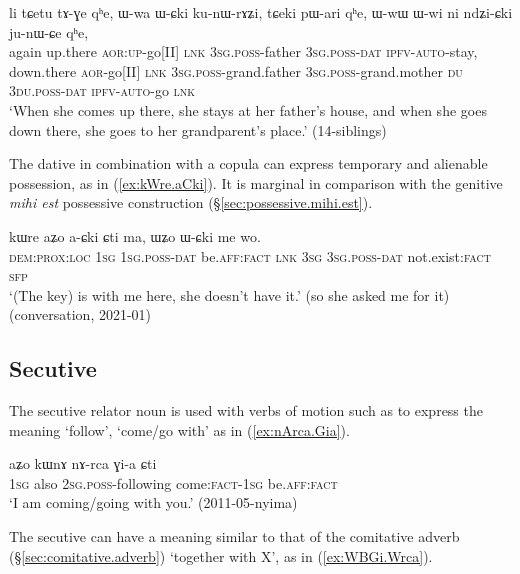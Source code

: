 \begin{exe}
\ex \label{ex:WCki.kunWrAZi}
\gll  li tɕetu tɤ-ɣe qʰe, ɯ-wa ɯ-ɕki ku-nɯ-rɤʑi, tɕeki pɯ-ari qʰe, ɯ-wɯ ɯ-wi ni ndʑi-ɕki ju-nɯ-ɕe qʰe, \\
again up.there \textsc{aor}:\textsc{up}-go[II] \textsc{lnk} \textsc{3sg}.\textsc{poss}-father \textsc{3sg}.\textsc{poss}-\textsc{dat} \textsc{ipfv}-\textsc{auto}-stay, down.there \textsc{aor}-go[II] \textsc{lnk} \textsc{3sg}.\textsc{poss}-grand.father \textsc{3sg}.\textsc{poss}-grand.mother \textsc{du} \textsc{3du}.\textsc{poss}-\textsc{dat} \textsc{ipfv}-\textsc{auto}-go \textsc{lnk}  \\
\glt `When she comes up there, she stays at her father's house, and when she goes down there, she goes to her grandparent's place.' (14-siblings)
\end{exe}

The dative in combination with a copula can express temporary and alienable possession, as in (\ref{ex:kWre.aCki}). It is marginal in comparison with the genitive \textit{mihi est} possessive construction (§\ref{sec:possessive.mihi.est}).

\begin{exe}
	\ex \label{ex:kWre.aCki}
	\gll kɯre aʑo a-ɕki ɕti ma, ɯʑo ɯ-ɕki me wo. \\
	\textsc{dem}:\textsc{prox}:\textsc{loc} \textsc{1sg} \textsc{1sg}.\textsc{poss}-\textsc{dat} be.\textsc{aff}:\textsc{fact} \textsc{lnk} \textsc{3sg} \textsc{3sg}.\textsc{poss}-\textsc{dat} not.exist:\textsc{fact} \textsc{sfp} \\
	\glt `(The key) is with me here, she doesn't have it.' (so she asked me for it) (conversation, 2021-01)
\end{exe}

\subsection{Secutive} \label{sec:secutive} 
The secutive relator noun   is used with verbs of motion such as  to express the meaning `follow', `come/go with' as in (\ref{ex:nArca.Gia}).

\begin{exe}
\ex \label{ex:nArca.Gia}
 \gll  aʑo kɯnɤ nɤ-rca ɣi-a ɕti \\
 \textsc{1sg} also \textsc{2sg}.\textsc{poss}-following come:\textsc{fact}-\textsc{1sg} be.\textsc{aff}:\textsc{fact} \\
\glt `I am coming/going with you.' (2011-05-nyima)
\end{exe}
The secutive can have a meaning similar to that of the comitative adverb (§\ref{sec:comitative.adverb}) `together with X', as in (\ref{ex:WBGi.Wrca}).

